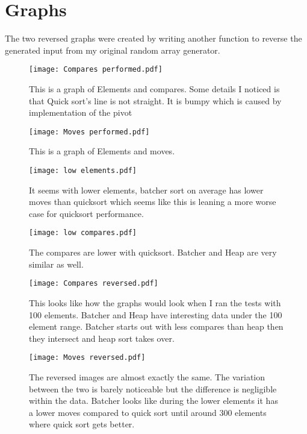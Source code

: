 \documentclass{article}
\begin{document}
\section{Graphs}
The two reversed graphs were created by writing another function to reverse the generated input from my original random array generator. 
\begin{figure}[htp]
    \centering
    \texttt{[image: Compares performed.pdf]}
    \caption{This is a graph of Elements and compares. Some details I noticed is that Quick sort's line is not straight. It is bumpy which is caused by implementation of the pivot}
\end{figure}
\begin{figure}[htp]
    \centering
    \texttt{[image: Moves performed.pdf]}
    \caption{This is a graph of Elements and moves.}
\end{figure}
\begin{figure}[htp]
    \centering
    \texttt{[image: low elements.pdf]}
    \caption{It seems with lower elements, batcher sort on average has lower moves than quicksort which seems like this is leaning a more worse case for quicksort performance.}
\end{figure}
\begin{figure}[htp]
    \centering
    \texttt{[image: low compares.pdf]}
    \caption{The compares are lower with quicksort. Batcher and Heap are very similar as well. }
    \end{figure}
\begin{figure}[htp]
    \centering
    \texttt{[image: Compares reversed.pdf]}
    \caption{This looks like how the graphs would look when I ran the tests with 100 elements. Batcher and Heap have interesting data under the 100 element range. Batcher starts out with less compares than heap then they intersect and heap sort takes over.}
\end{figure}
\begin{figure}[htp]
    \centering
    \texttt{[image: Moves reversed.pdf]}
    \caption{The reversed images are almost exactly the same. The variation between the two is barely noticeable but the difference is negligible within the data. Batcher looks like during the lower elements it has a lower moves compared to quick sort until around 300 elements where quick sort gets better.}
\end{figure}
\end{document}
